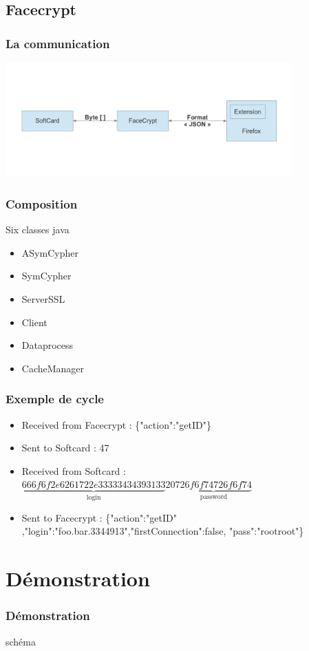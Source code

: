 \documentclass{beamer}
\begin{document}
\subsection{Facecrypt}
\begin{frame}
    \frametitle{La communication}
    \includegraphics[width=11cm]{schema_dolby}
\end{frame}

\begin{frame}
    \frametitle{Composition}
	\begin{block}{Six classes java}
	\begin{itemize}
	\item ASymCypher
	\item SymCypher
	\item ServerSSL
	\item Client
	\item Dataprocess
	\item CacheManager
	\end{itemize}
	\end{block}
\end{frame}

\begin{frame}
    \frametitle{Exemple de cycle}

	\begin{itemize}
	\item Received from Facecrypt : \{"action":"getID"\}
	\item Sent to Softcard : 47
	\item Received from Softcard : $\underbrace{666f6f2e6261722e33333434393133}_{\textrm{login}} 20 \underbrace{726f6f74726f6f74}_{\textrm{password}}$
	\item Sent to Facecrypt : \{"action":"getID" ,"login":"foo.bar.3344913","firstConnection":false, "pass":"rootroot"\}
\end{itemize}

\end{frame}

\section{Démonstration}
\begin{frame}
\frametitle{Démonstration}
schéma
\end{frame}
\end{document}
